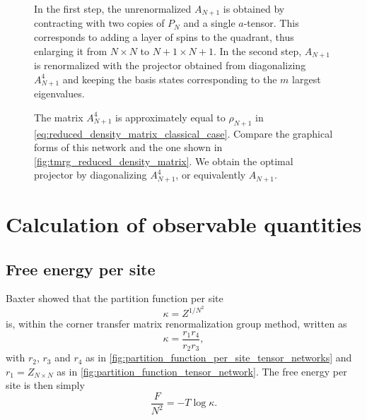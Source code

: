 \begin{figure}
  
  \caption{In the first step, the unrenormalized $A_{N+1}$ is obtained by contracting with
  two copies of $P_N$ and a single $a$-tensor. This corresponds to adding a layer of spins
  to the quadrant, thus enlarging it from $N \times N$ to $N + 1 \times N + 1$. In the
  second step, $A_{N + 1}$ is renormalized with the projector obtained from diagonalizing
  $A_{N+1}^4$ and keeping the basis states corresponding to the $m$ largest eigenvalues.  }
  \label{fig:ctmrg_add_site_and_renormalize}
\end{figure}

\begin{figure}
  
  \caption{The matrix $A_{N+1}^4$ is approximately equal to $\rho_{N+1}$ in
  \autoref{eq:reduced_density_matrix_classical_case}. Compare the graphical forms of this
  network and the one shown in \autoref{fig:tmrg_reduced_density_matrix}. We obtain the
  optimal projector by diagonalizing $A_{N + 1}^4$, or equivalently $A_{N+1}$.}
  \label{fig:ctmrg_reduced_density_matrix}
\end{figure}



\section{Calculation of observable quantities}
\subsection{Free energy per site}
Baxter \cite{baxter1978variational, baxter1982exactly_ctm} showed that the partition function per site
\begin{equation}
  \kappa = Z^{1/N^2}
\end{equation}
is, within the corner transfer matrix renormalization group method, written as
\begin{equation}\label{eq:partition_function_per_site_variational_approximation}
  \kappa = \frac{r_1 r_4}{r_2 r_3},
\end{equation}
with $r_2$, $r_3$ and $r_4$ as in \autoref{fig:partition_function_per_site_tensor_networks} and $r_1 = Z_{N \times N}$
as in \autoref{fig:partition_function_tensor_network}. The free energy per site is then simply
\begin{equation}
  \frac{F}{N^2} = -T \log \kappa.
\end{equation}

